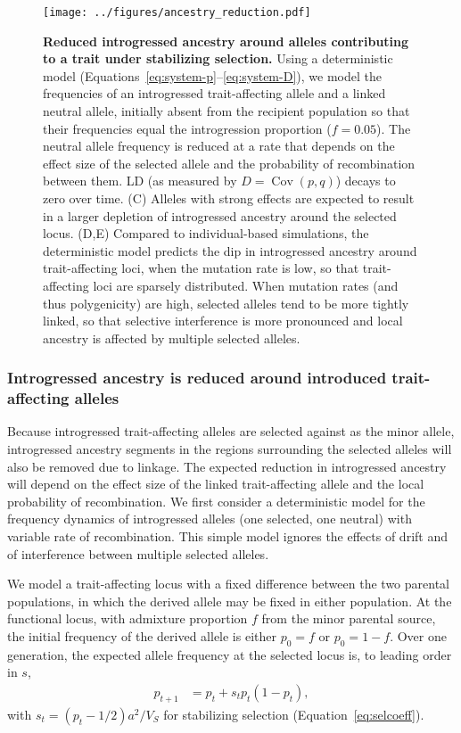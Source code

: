 \documentclass{article}
\DeclareMathOperator{\Cov}{Cov}
\begin{document}
\begin{figure}[ht!]
    \centering
    \texttt{[image: ../figures/ancestry\_reduction.pdf]}
    \caption{
        \textbf{Reduced introgressed ancestry around alleles contributing to a
        trait under stabilizing selection.} Using a deterministic model
        (Equations~\ref{eq:system-p}--\ref{eq:system-D}), we model the
        frequencies of an introgressed trait-affecting allele and a linked
        neutral allele, initially absent from the recipient population so that
        their frequencies equal the introgression proportion ($f=0.05$). The
        neutral allele frequency is reduced at a rate that depends on the
        effect size of the selected allele and the probability of recombination
        between them. LD (as measured by $D=\Cov(p,q)$) decays to zero over
        time. (C) Alleles with strong effects are expected to result in a
        larger depletion of introgressed ancestry around the selected locus.
        (D,E) Compared to individual-based simulations, the deterministic model
        predicts the dip in introgressed ancestry around trait-affecting loci,
        when the mutation rate is low, so that trait-affecting loci are
        sparsely distributed. When mutation rates (and thus polygenicity) are
        high, selected alleles tend to be more tightly linked, so that
        selective interference is more pronounced and local ancestry is
        affected by multiple selected alleles.
    }
    \label{fig:linkage}
\end{figure}

\subsubsection*{Introgressed ancestry is reduced around introduced
trait-affecting alleles}

Because introgressed trait-affecting alleles are selected against as the minor
allele, introgressed ancestry segments in the regions surrounding the selected
alleles will also be removed due to linkage. The expected reduction in
introgressed ancestry will depend on the effect size of the linked
trait-affecting allele and the local probability of recombination. We first
consider a deterministic model for the frequency dynamics of introgressed
alleles (one selected, one neutral) with variable rate of recombination. This
simple model ignores the effects of drift and of interference between multiple
selected alleles.

We model a trait-affecting locus with a fixed difference between the two
parental populations, in which the derived allele may be fixed in either
population. At the functional locus, with admixture proportion $f$ from the
minor parental source, the initial frequency of the derived allele is either
$p_0=f$ or $p_0=1-f$. Over one generation, the expected allele frequency at the
selected locus is, to leading order in $s$,
\begin{align}\label{eq:system-p}
    p_{t+1} & = p_t + s_tp_t(1-p_t),
\end{align}
with \(s_t=(p_t-1/2)a^2/V_S\) for stabilizing selection
(Equation~\ref{eq:selcoeff}).
\end{document}
